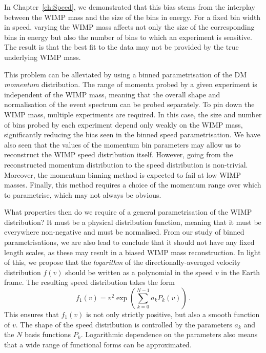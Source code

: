 In Chapter~\ref{ch:Speed}, we demonstrated that this bias stems from the interplay between the WIMP mass and the size of the bins in energy. For a fixed bin width in speed, varying the WIMP mass affects not only the size of the corresponding bins in energy but also the number of bins to which an experiment is sensitive. The result is that the best fit to the data may not be provided by the true underlying WIMP mass.

This problem can be alleviated by using a binned parametrisation of the DM \textit{momentum} distribution. The range of momenta probed by a given experiment is independent of the WIMP mass, meaning that the overall shape and normalisation of the event spectrum can be probed separately. To pin down the WIMP mass, multiple experiments are required. In this case, the size and number of bins probed by each experiment depend only weakly on the WIMP mass, significantly reducing the bias seen in the binned speed parametrisation. We have also seen that the values of the momentum bin parameters may allow us to reconstruct the WIMP speed distribution itself. However, going from the reconstructed momentum distribution to the speed distribution is non-trivial. Moreover, the momentum binning method is expected to fail at low WIMP masses. Finally, this method requires a choice of the momentum range over which to parametrise, which may not always be obvious.

What properties then do we require of a general parametrisation of the WIMP distribution? It must be a physical distribution function, meaning that it must be everywhere non-negative and must be normalised. From our study of binned parametrisations, we are also lead to conclude that it should not have any fixed length scales, as these may result in a biased WIMP mass reconstruction. In light of this, we propose that the \textit{logarithm} of the directionally-averaged velocity distribution $f(v)$ should be written as a polynomial in the speed $v$ in the Earth frame. The resulting speed distribution takes the form
\begin{equation}
f_1(v) = v^2 \exp \left(\sum_{k=0}^{N-1} a_k P_k(v)\right)\,.
\end{equation}
This ensures that $f_1(v)$ is not only strictly positive, but also a smooth function of $v$. The shape of the speed distribution is controlled by the parameters $a_k$ and the $N$ basis functions $P_k$. Logarithmic dependence on the parameters also means that a wide range of functional forms can be approximated.

